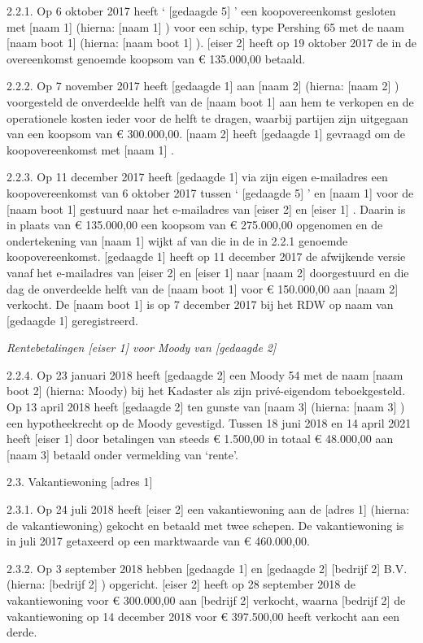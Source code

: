 \documentclass[
  dutch,
  a4paper,
]{article}
\begin{document}
2.2.1. Op 6 oktober 2017 heeft ` {[}gedaagde 5{]} ' een koopovereenkomst gesloten met {[}naam 1{]} (hierna: {[}naam 1{]} ) voor een schip, type Pershing 65 met de naam {[}naam boot 1{]} (hierna: {[}naam boot 1{]} ). {[}eiser 2{]} heeft op 19 oktober 2017 de in de overeenkomst genoemde koopsom van € 135.000,00 betaald.

2.2.2. Op 7 november 2017 heeft {[}gedaagde 1{]} aan {[}naam 2{]} (hierna: {[}naam 2{]} ) voorgesteld de onverdeelde helft van de {[}naam boot 1{]} aan hem te verkopen en de operationele kosten ieder voor de helft te dragen, waarbij partijen zijn uitgegaan van een koopsom van € 300.000,00. {[}naam 2{]} heeft {[}gedaagde 1{]} gevraagd om de koopovereenkomst met {[}naam 1{]} .

2.2.3. Op 11 december 2017 heeft {[}gedaagde 1{]} via zijn eigen e-mailadres een koopovereenkomst van 6 oktober 2017 tussen ` {[}gedaagde 5{]} ' en {[}naam 1{]} voor de {[}naam boot 1{]} gestuurd naar het e-mailadres van {[}eiser 2{]} en {[}eiser 1{]} . Daarin is in plaats van € 135.000,00 een koopsom van € 275.000,00 opgenomen en de ondertekening van {[}naam 1{]} wijkt af van die in de in 2.2.1 genoemde koopovereenkomst. {[}gedaagde 1{]} heeft op 11 december 2017 de afwijkende versie vanaf het e-mailadres van {[}eiser 2{]} en {[}eiser 1{]} naar {[}naam 2{]} doorgestuurd en die dag de onverdeelde helft van de {[}naam boot 1{]} voor € 150.000,00 aan {[}naam 2{]} verkocht. De {[}naam boot 1{]} is op 7 december 2017 bij het RDW op naam van {[}gedaagde 1{]} geregistreerd.

\emph{Rentebetalingen {[}eiser 1{]} voor Moody van {[}gedaagde 2{]}}

2.2.4. Op 23 januari 2018 heeft {[}gedaagde 2{]} een Moody 54 met de naam {[}naam boot 2{]} (hierna: Moody) bij het Kadaster als zijn privé-eigendom teboekgesteld. Op 13 april 2018 heeft {[}gedaagde 2{]} ten gunste van {[}naam 3{]} (hierna: {[}naam 3{]} ) een hypotheekrecht op de Moody gevestigd. Tussen 18 juni 2018 en 14 april 2021 heeft {[}eiser 1{]} door betalingen van steeds € 1.500,00 in totaal € 48.000,00 aan {[}naam 3{]} betaald onder vermelding van `rente'.

2.3. Vakantiewoning {[}adres 1{]}

2.3.1. Op 24 juli 2018 heeft {[}eiser 2{]} een vakantiewoning aan de {[}adres 1{]} (hierna: de vakantiewoning) gekocht en betaald met twee schepen. De vakantiewoning is in juli 2017 getaxeerd op een marktwaarde van € 460.000,00.

2.3.2. Op 3 september 2018 hebben {[}gedaagde 1{]} en {[}gedaagde 2{]} {[}bedrijf 2{]} B.V. (hierna: {[}bedrijf 2{]} ) opgericht. {[}eiser 2{]} heeft op 28 september 2018 de vakantiewoning voor € 300.000,00 aan {[}bedrijf 2{]} verkocht, waarna {[}bedrijf 2{]} de vakantiewoning op 14 december 2018 voor € 397.500,00 heeft verkocht aan een derde.
\end{document}
